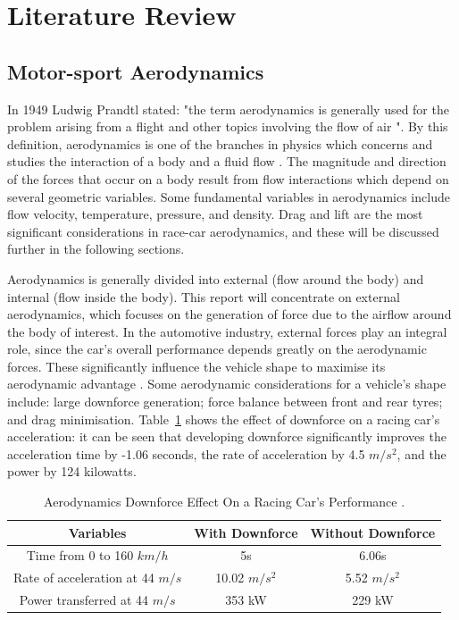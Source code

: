 \section{Literature Review}

\subsection{Motor-sport Aerodynamics}
In 1949 Ludwig Prandtl stated: "the term aerodynamics is generally used for the problem arising from a flight and other topics involving the flow of air \cite{Anderson2010FundamentalsAerodynamics}". By this definition, aerodynamics is one of the branches in physics which concerns and studies the interaction of a body and a fluid flow \cite{Scibor-Rylski1984RoadAerodynamics}. The magnitude and direction of the forces that occur on a body result from flow interactions which depend on several geometric variables. Some fundamental variables in aerodynamics include flow velocity, temperature, pressure, and density. Drag and lift are the most significant considerations in race-car aerodynamics, and these will be discussed further in the following sections.

\noindent Aerodynamics is generally divided into external (flow around the body) and internal (flow inside the body). This report will concentrate on external aerodynamics, which focuses on the generation of force due to the airflow around the body of interest. In the automotive industry, external forces play an integral role, since the car's overall performance depends greatly on the aerodynamic forces. These significantly influence the vehicle shape to maximise its aerodynamic advantage \cite{Scibor-Rylski1984RoadAerodynamics}. Some aerodynamic considerations for a vehicle's shape include: large downforce generation; force balance between front and rear tyres; and drag minimisation. Table~\ref{Table1} shows the effect of downforce on a racing car's acceleration: it can be seen that developing downforce significantly improves the acceleration time by -1.06 seconds, the rate of acceleration by 4.5 $m/s^2$, and the power by 124 kilowatts. 

\begin{table}[!ht]
\caption{\label{Table1} Aerodynamics Downforce Effect On a Racing Car's Performance \cite{Scibor-Rylski1984RoadAerodynamics}.}
\vspace{-5mm}
\begin{center}
 \begin{tabular}{||c| c| c ||} 
 \hline
 Variables & With Downforce & Without Downforce \\ [0.5ex] 
 \hline\hline
 Time from 0 to 160 $km/h$ & 5s & 6.06s \\ 
 \hline
 Rate of acceleration at 44 $m/s$ & 10.02 $m/s^{2}$ & 5.52 $m/s^2$ \\
 \hline
 Power transferred at 44 $m/s$ & 353 kW & 229 kW  \\
 \hline
\end{tabular}
\end{center}
\end{table}

